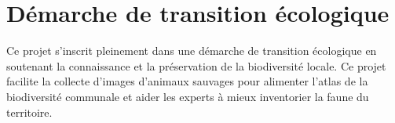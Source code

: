 \section{Démarche de transition écologique}

Ce projet s’inscrit pleinement dans une démarche de transition écologique en soutenant la connaissance et
la préservation de la biodiversité locale. Ce projet facilite la collecte d’images d’animaux sauvages pour
alimenter l’atlas de la biodiversité communale et aider les experts à mieux inventorier la faune du territoire.

